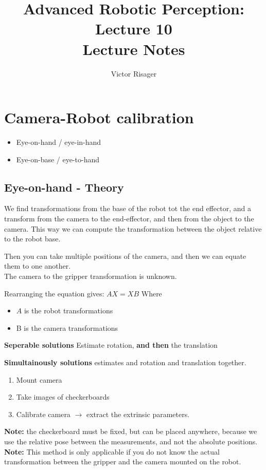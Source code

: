 \documentclass[a4paper]{article}
\title{Advanced Robotic Perception: Lecture 10 \\
	\large Lecture Notes}
\author{Victor Risager}
\begin{document}
\maketitle
\section{Camera-Robot calibration}
\begin{itemize}
	\item Eye-on-hand / eye-in-hand
	\item Eye-on-base / eye-to-hand
\end{itemize}

\subsection{Eye-on-hand - Theory}
We find transformations from the base of the robot tot the end effector, and a transform from the camera to the end-effector, and then from the object to the camera. 
This way we can compute the transformation between the object relative to the robot base. 

Then you can take multiple positions of the camera, and then we can equate them to one another. \\
The camera to the gripper transformation is unknown.

Rearranging the equation gives:
$ AX = XB $
Where
\begin{itemize}
	\item $ A $ is the robot transformations
	\item B is the camera transformations
\end{itemize}

\textbf{Seperable solutions} 
Estimate rotation, \textbf{and then} the translation

\textbf{Simultainously solutions} 
estimates and rotation and translation together.

\begin{enumerate}
	\item Mount camera
	\item Take images of checkerboards
	\item Calibrate camera $ \rightarrow  $ extract the extrinsic parameters.
\end{enumerate}

\textbf{Note:} the checkerboard must be fixed, but can be placed anywhere, because we use the relative pose between the measurements, and not the absolute positions. \\
\textbf{Note:} This method is only applicable if you do not know the actual transformation between the gripper and the camera mounted on the robot.
\end{document}
